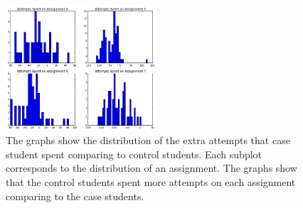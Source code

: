 \documentclass{sigchi/sigchi}
\begin{document}
\begin{table}
\caption{The table listed the extra minutes that control spent comparing to case. We first compare the time spent for each assignment, then we look at all assignments at the end. We perform a two tailed t-test with the null hypothesis that control students spent the same amount of time on problems as case students. The final p-value of the two tailed t-test for all assignments is small enough that we can reject the null hypothesis.}
\begin{center}
  \label{tab:no_hint_time}
  \end{center}
\end{table}


\begin{figure}[ht]
\includegraphics[width=0.5\textwidth]{image/assignment_tries_downstream.png}
\caption{The graphs show the distribution of the extra attempts that case student spent comparing to control students. Each subplot corresponds to the distribution of an assignment. The graphs show that the control students spent more attempts on each assignment comparing to the case students.}
    \label{fig:downstream_tries_analysis}
\end{figure}
\end{document}
